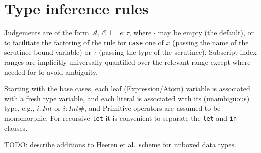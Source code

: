 \documentclass[11pt]{article}
\newcommand{\cA}{\mathcal{A}}
\newcommand{\cC}{\mathcal{C}}
\begin{document}
\clearpage
\section{Type inference rules}
Judgements are of the form $\cA,\ \cC\ \vdash_{\cdot}\ e:\tau$, where $\cdot$ may be empty (the default),
or to facilitate the factoring
of the rule for \texttt{case} one of $x$ (passing the name of the scrutinee-bound variable) or
$\tau$ (passing the type of the scrutinee).   Subscript index ranges
are implicitly universally quantified over the relevant range except where needed for to avoid ambiguity.

Starting with the base cases, each leaf (Expression/Atom) variable is
associated with a fresh type variable, and each literal is associated with its
(unambiguous) type, e.g., $i:\mathit{Int}$ or $i:\mathit{Int\#}$, and
Primitive operators are assumed to be monomorphic.
For recursive \texttt{let} it is convenient to separate the \texttt{let} and \texttt{in} clauses.

TODO:  describe additions to Heeren et al.\ scheme for unboxed data types.
\end{document}
